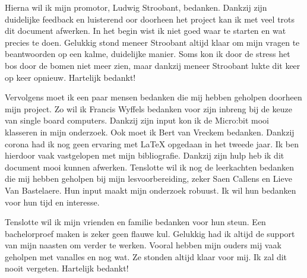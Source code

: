 Hierna wil ik mijn promotor, Ludwig Stroobant, bedanken. Dankzij zijn duidelijke feedback en luisterend oor doorheen het project kan ik met veel trots dit document afwerken. In het begin wist ik niet goed waar te starten en wat precies te doen. Gelukkig stond meneer Stroobant altijd klaar om mijn vragen te beantwoorden op een kalme, duidelijke manier. Soms kon ik door de stress het bos door de bomen niet meer zien, maar dankzij meneer Stroobant lukte dit keer op keer opnieuw. Hartelijk bedankt!

Vervolgens moet ik een paar mensen bedanken die mij hebben geholpen doorheen mijn project. Zo wil ik Francis Wyffels bedanken voor zijn inbreng bij de keuze van single board computers. Dankzij zijn input kon ik de Micro:bit mooi klasseren in mijn onderzoek. Ook moet ik Bert van Vreckem bedanken. Dankzij corona had ik nog geen ervaring met LaTeX opgedaan in het tweede jaar. Ik ben hierdoor vaak vastgelopen met mijn bibliografie. Dankzij zijn hulp heb ik dit document mooi kunnen afwerken. Tenslotte wil ik nog de leerkachten bedanken die mij hebben geholpen bij mijn lesvoorbereiding, zeker Saen Callens en Lieve Van Bastelaere. Hun input maakt mijn onderzoek robuust. Ik wil hun bedanken voor hun tijd en interesse.

Tenslotte wil ik mijn vrienden en familie bedanken voor hun steun. Een bachelorproef maken is zeker geen flauwe kul. Gelukkig had ik altijd de support van mijn naasten om verder te werken. Vooral hebben mijn ouders mij vaak geholpen met vanalles en nog wat. Ze stonden altijd klaar voor mij. Ik zal dit nooit vergeten. Hartelijk bedankt!

  